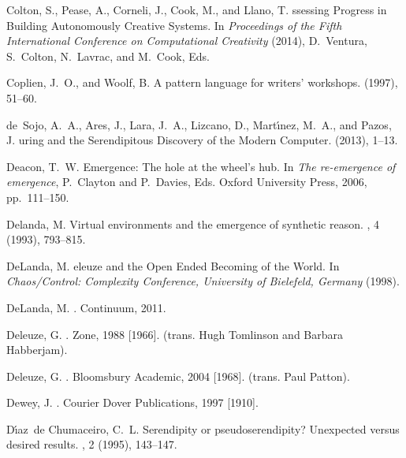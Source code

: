\documentclass{llncs}
\begin{document}
\begin{thebibliography}{10}
{\sc Colton, S., Pease, A., Corneli, J., Cook, M., and Llano, T.}
ssessing {P}rogress in {B}uilding {A}utonomously {C}reative
  {S}ystems.
\newblock In {\em Proceedings of the Fifth International Conference on
  Computational Creativity\/} (2014), D.~Ventura, S.~Colton, N.~Lavrac, and
  M.~Cook, Eds.

{\sc Coplien, J.~O., and Woolf, B.}
\newblock A pattern language for writers' workshops.
 (1997), 51--60.

{\sc de~Sojo, A.~A., Ares, J., Lara, J.~A., Lizcano, D., Mart{\'\i}nez, M.~A.,
  and Pazos, J.}
uring and the {S}erendipitous {D}iscovery of the {M}odern
  {C}omputer.
 (2013), 1--13.

{\sc Deacon, T.~W.}
\newblock Emergence: {T}he hole at the wheel{'}s hub.
\newblock In {\em The re-emergence of emergence}, P.~Clayton and P.~Davies,
  Eds. Oxford University Press, 2006, pp.~111--150.

{\sc Delanda, M.}
\newblock Virtual environments and the emergence of synthetic reason.
, 4 (1993), 793--815.

{\sc DeLanda, M.}
eleuze and the {O}pen {E}nded {B}ecoming of the {W}orld.
\newblock In {\em {C}haos/{C}ontrol: {C}omplexity {C}onference, {U}niversity of
  {B}ielefeld, {G}ermany\/} (1998).

{\sc DeLanda, M.}
.
\newblock Continuum, 2011.

{\sc Deleuze, G.}
.
\newblock Zone, 1988 [1966].
\newblock (trans. Hugh Tomlinson and Barbara Habberjam).

{\sc Deleuze, G.}
.
\newblock Bloomsbury Academic, 2004 [1968].
\newblock (trans. Paul Patton).

{\sc Dewey, J.}
.
\newblock Courier Dover Publications, 1997 [1910].

{\sc D{\'{\i}}az~de Chumaceiro, C.~L.}
\newblock Serendipity or pseudoserendipity? {U}nexpected versus desired
  results.
, 2 (1995), 143--147.


\end{thebibliography}
\end{document}
